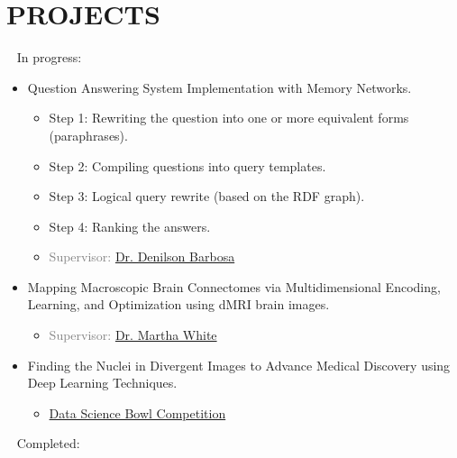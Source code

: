 \section{PROJECTS}
\vspace{0.3em}
\textcolor{blue}{\faSpinner} ~ In progress:
	\begin{itemize}
		\item Question Answering System Implementation with Memory Networks.
		\begin{itemize}
			\item Step 1: Rewriting the question into one or more 
			equivalent forms (paraphrases).
			\item Step 2: Compiling questions into query templates.
			\item Step 3: Logical query rewrite (based on the
			RDF graph).
			\item Step 4: Ranking the answers.
			\item \textcolor{gray}{Supervisor: \href{https://sites.ualberta.ca/~denilson/}{Dr. Denilson Barbosa}}
		\end{itemize}
		
		\item Mapping Macroscopic Brain Connectomes via
		Multidimensional Encoding, Learning, and Optimization using dMRI brain images.
		\begin{itemize}
			\item \textcolor{gray}{Supervisor: \href{http://webdocs.cs.ualberta.ca/~whitem/}{Dr. Martha White}}
		\end{itemize}
		
		\item Finding the Nuclei in Divergent Images to Advance
		Medical Discovery using Deep Learning Techniques.
		\begin{itemize}
			\item \textcolor{gray}{\href{https://www.kaggle.com/c/data-science-bowl-2018}{Data Science Bowl Competition}}
		\end{itemize}
		
	\end{itemize}
	\vspace{0.3em}
	\textcolor{darkgreen}{\faCheckSquareO} ~ Completed:
